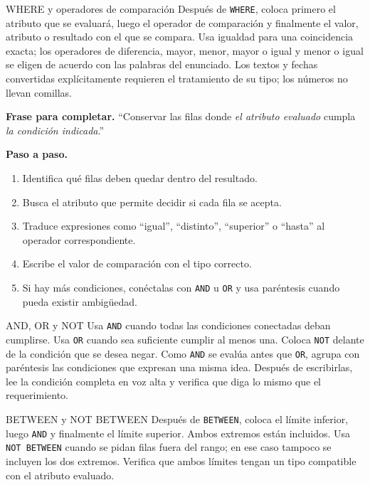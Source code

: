 \documentclass[11pt,a4paper]{article}
\newcommand{\campo}[1]{\texttt{#1}}
\begin{document}
\begin{plantilla}{WHERE y operadores de comparación}
Después de \campo{WHERE}, coloca primero el atributo que se evaluará, luego el operador de
comparación y finalmente el valor, atributo o resultado con el que se compara. Usa igualdad para una
coincidencia exacta; los operadores de diferencia, mayor, menor, mayor o igual y menor o igual se
eligen de acuerdo con las palabras del enunciado. Los textos y fechas convertidas explícitamente
requieren el tratamiento de su tipo; los números no llevan comillas.

\textbf{Frase para completar.} ``Conservar las filas donde \emph{el atributo evaluado} cumpla
\emph{la condición indicada}.''

\textbf{Paso a paso.}
\begin{enumerate}[label=\arabic*.]
  \item Identifica qué filas deben quedar dentro del resultado.
  \item Busca el atributo que permite decidir si cada fila se acepta.
  \item Traduce expresiones como ``igual'', ``distinto'', ``superior'' o ``hasta'' al operador
  correspondiente.
  \item Escribe el valor de comparación con el tipo correcto.
  \item Si hay más condiciones, conéctalas con \campo{AND} u \campo{OR} y usa paréntesis cuando pueda
  existir ambigüedad.
\end{enumerate}
\end{plantilla}

\begin{plantilla}{AND, OR y NOT}
Usa \campo{AND} cuando todas las condiciones conectadas deban cumplirse. Usa \campo{OR} cuando sea
suficiente cumplir al menos una. Coloca \campo{NOT} delante de la condición que se desea negar.
Como \campo{AND} se evalúa antes que \campo{OR}, agrupa con paréntesis las condiciones que expresan
una misma idea. Después de escribirlas, lee la condición completa en voz alta y verifica que diga lo
mismo que el requerimiento.
\end{plantilla}

\begin{plantilla}{BETWEEN y NOT BETWEEN}
Después de \campo{BETWEEN}, coloca el límite inferior, luego \campo{AND} y finalmente el límite
superior. Ambos extremos están incluidos. Usa \campo{NOT BETWEEN} cuando se pidan filas fuera del
rango; en ese caso tampoco se incluyen los dos extremos. Verifica que ambos límites tengan un tipo
compatible con el atributo evaluado.
\end{plantilla}
\end{document}
